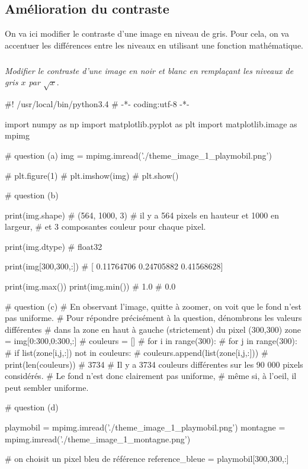 \documentclass[10pt,fleqn]{article} %
\begin{document}
\begin{multicols}{2}
\subsection*{Amélioration du contraste}
On va ici modifier le contraste d'une image en niveau de gris. 
Pour cela, on va accentuer les différences entre les niveaux en utilisant une fonction mathématique. 
\subparagraph{}\textit{Modifier le contraste d'une image en noir et blanc en remplaçant les niveaux de gris $x$ par $\sqrt{x}$}.








\ifprof
\begin{corrige}
\begin{python}
#! /usr/local/bin/python3.4
# -*- coding:utf-8 -*-
    
import numpy as np
import matplotlib.pyplot as plt
import matplotlib.image as mpimg

# question (a)
img = mpimg.imread('./theme_image_1_playmobil.png')  

# plt.figure(1)
# plt.imshow(img)
# plt.show()

# question (b)

print(img.shape)
# (564, 1000, 3)
# il y a 564 pixels en hauteur et 1000 en largeur,
# et 3 composantes couleur pour chaque pixel.
 
print(img.dtype)
# float32

print(img[300,300,:])
# [ 0.11764706  0.24705882  0.41568628]

print(img.max())
print(img.min())
# 1.0
# 0.0

# question (c)
# En observant l'image, quitte à zoomer, on voit que le fond n'est pas uniforme.
# Pour répondre précisément à la question, dénombrons les valeurs différentes
# dans la zone en haut à gauche (strictement) du pixel (300,300)
zone = img[0:300,0:300,:]
# couleurs = []
# for i in range(300):
#     for j in range(300):
#         if list(zone[i,j,:]) not in couleurs:
#             couleurs.append(list(zone[i,j,:]))
# print(len(couleurs))
# 3734
# Il y a 3734 couleurs différentes sur les 90 000 pixels considérés.
# Le fond n'est donc clairement pas uniforme,
# même si, à l'oeil, il peut sembler uniforme.

# question (d)

playmobil = mpimg.imread('./theme_image_1_playmobil.png')  
montagne = mpimg.imread('./theme_image_1_montagne.png')

# on choisit un pixel bleu de référence
reference_bleue = playmobil[300,300,:]


\end{python}
\end{corrige}
\end{multicols}
\end{document}
